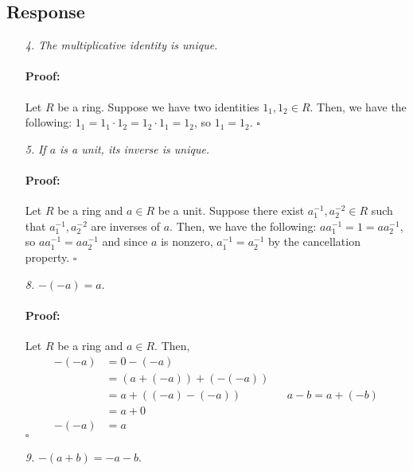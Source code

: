 \documentclass [12pt] {article}
\newenvironment{proof}{\paragraph{Proof:}}{\hfill$\square$}
\renewcommand{\it}[1]{\textit{{#1}}}
\begin{document}
\subsection*{Response}
\begin{enumerate}
    \item[\it{4.}] \it{The multiplicative identity is unique.} \vspace{-12pt}

        \begin{proof}
            Let $R$ be a ring. Suppose we have two identities $1_1, 1_2 \in R$. Then, we have the
            following: $1_1 = 1_1 \cdot 1_2 = 1_2 \cdot 1_1 = 1_2$, so $1_1 = 1_2$.
        \end{proof}
    \item[\it{5.}] \it{If $a$ is a unit, its inverse is unique.} \vspace{-12pt}

        \begin{proof}
            Let $R$ be a ring and $a \in R$ be a unit. Suppose there exist $a^{-1}_1, a^{-2}_2 \in R$
            such that $a^{-1}_1, a^{-2}_2$ are inverses of $a$. Then, we have the following:
            $aa^{-1}_1 = 1 = aa^{-1}_2$, so $aa^{-1}_1 = aa^{-1}_2$ and since $a$ is nonzero, 
            $a^{-1}_1 = a^{-1}_2$ by the cancellation property.
        \end{proof}
    \item[\it{8.}] $-(-a) = a$. \vspace{-12pt}

        \begin{proof}
            Let $R$ be a ring and $a \in R$. Then, 
            \begin{align*}
                -(-a) &= 0 - (-a) \\
                      &= (a + (-a)) + (-(-a)) \\
                      &= a + ((-a) - (-a)) && a - b = a + (-b) \\
                      &= a + 0 \\
                -(-a) &= a
            \end{align*}
        \end{proof}
    \item[\it{9.}] $-(a + b) = -a - b$. \vspace{-12pt}


\end{enumerate}
\end{document}

